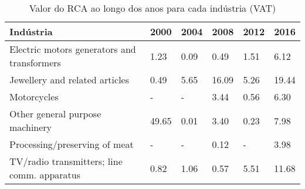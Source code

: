 \begin{table}
\centering
\caption{Valor do RCA ao longo dos anos para cada indústria (VAT)}
\begin{tabular}{p{6cm}p{1.5cm}p{1.5cm}p{1.5cm}p{1.5cm}p{1.5cm}}
\toprule
                                  Indústria &  2000 & 2004 &  2008 & 2012 &  2016 \\
\midrule
Electric motors generators and transformers &  1.23 & 0.09 &  0.49 & 1.51 &  6.12 \\
             Jewellery and related articles &  0.49 & 5.65 & 16.09 & 5.26 & 19.44 \\
                                Motorcycles &     - &    - &  3.44 & 0.56 &  6.30 \\
            Other general purpose machinery & 49.65 & 0.01 &  3.40 & 0.23 &  7.98 \\
              Processing/preserving of meat &     - &    - &  0.12 &    - &  3.98 \\
TV/radio transmitters; line comm. apparatus &  0.82 & 1.06 &  0.57 & 5.51 & 11.68 \\
\bottomrule
\end{tabular}
\end{table}
